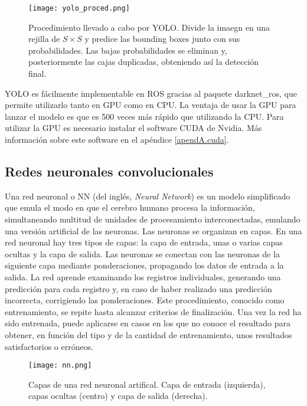\begin{figure}[h]
	\begin{center} 
		\texttt{[image: yolo\_proced.png]}
	\end{center}
	\caption{Procedimiento llevado a cabo por YOLO. Divide la imaegn en una rejilla de $S \times S$ y predice las bounding boxes junto con sus probabilidades. Las bajas probabilidades se eliminan y, posteriormente las cajas duplicadas, obteniendo así la detección final.}
	\label{fig:proced}
\end{figure}

YOLO es fácilmente implementable en ROS gracias al paquete darknet\_ros, que permite utilizarlo tanto en GPU como en CPU. La ventaja de usar la GPU para lanzar el modelo es que es 500 veces más rápido que utilizando la CPU. Para utilizar la GPU es necesario instalar el software CUDA de Nvidia. Más información sobre este software en el apéndice \ref{apendA.cuda}.\\

\subsection{Redes neuronales convolucionales}

Una red neuronal o NN (del inglés, \textit{Neural Network}) es un modelo simplificado que emula el modo en que el cerebro humano procesa la información, simultaneando multitud de unidades de procesamiento interconectadas, emulando una versión artificial de las neuronas. Las neuronas se organizan en capas. En una red neuronal hay tres tipos de capas: la capa de entrada, unas o varias capas ocultas y la capa de salida. Las neuronas se conectan con las neuronas de la siguiente capa mediante ponderaciones, propagando los datos de entrada a la salida. La red aprende examinando los registros individuales, generando una predicción para cada registro y, en caso de haber realizado una predicción incorrecta, corrigiendo las ponderaciones. Este procedimiento, conocido como entrenamiento, se repite hasta alcanzar criterios de finalización.  Una vez la red ha sido entrenada, puede aplicarse en casos en los que no conoce el resultado para obtener, en función del tipo y de la cantidad de entrenamiento, unos resultados satisfactorios o erróneos. \cite{nn}\\

\begin{figure}[h]
	\begin{center} 
		\texttt{[image: nn.png]}
	\end{center}
	\caption{Capas de una red neuronal artifical. Capa de entrada (izquierda), capas ocultas (centro) y capa de salida (derecha). \cite{foto_nn}}
	\label{fig:nn}
\end{figure}

